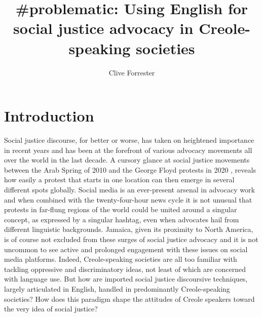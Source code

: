 \documentclass[output=paper,colorlinks,citecolor=brown]{langscibook}
\title[\#problematic] {{\#problematic}: Using English for social justice advocacy in Creole-speaking societies}
\author{Clive Forrester\affiliation{University of Waterloo}}
\begin{document}
\maketitle

\section{Introduction}

Social justice discourse, for better or worse, has taken on heightened importance in recent years and has been at the forefront of various advocacy movements all over the world in the last decade. A cursory glance at social justice movements between the Arab Spring of 2010 \citep{TheEditorsEncyclopediaBritannica2015} and the George Floyd protests in 2020 \citep{Taylor2021}, reveals how easily a protest that starts in one location can then emerge in several different spots globally. Social media is an ever-present arsenal in advocacy work and when combined with the twenty-four-hour news cycle it is not unusual that protests in far-flung regions of the world could be united around a singular concept, as expressed by a singular hashtag, even when advocates hail from different linguistic backgrounds. Jamaica, given its proximity to North America, is of course not excluded from these surges of social justice advocacy and it is not uncommon to see active and prolonged engagement with these issues on social media platforms. Indeed, Creole-speaking societies are all too familiar with tackling oppressive and discriminatory ideas, not least of which are concerned with language use. But how are imported social justice discoursive techniques, largely articulated in English, handled in predominantly Creole-speaking societies? How does this paradigm shape the attitudes of Creole speakers toward the very idea of social justice? 
\end{document}
